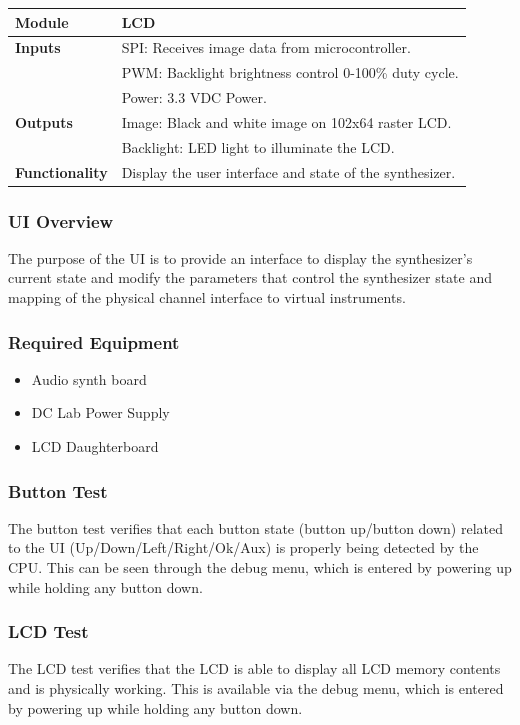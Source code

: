 \documentclass{article}
\begin{document}
\begin{tabular}{|p{1in}|p{5in}|}
\hline
\textbf{Module} & LCD \\
\hline
\textbf{Inputs}& SPI: Receives image data from microcontroller.\\
	     & PWM: Backlight brightness control 0-100\% duty cycle.\\
	     & Power: 3.3 VDC Power.\\
\hline
\textbf{Outputs}& Image: Black and white image on 102x64 raster LCD.\\
	      & Backlight: LED light to illuminate the LCD.\\ 
\hline
\textbf{Functionality}& Display the user interface and state of the synthesizer.\\
\hline
\end{tabular}

\subsubsection{UI Overview}
The purpose of the UI is to provide an interface to display the synthesizer's current state and modify the parameters that control the synthesizer state and mapping of the physical channel interface to virtual instruments. 
\subsubsection{Required Equipment}
\begin{itemize}
\item Audio synth board
\item DC Lab Power Supply
\item LCD Daughterboard
\end{itemize}
\subsubsection{Button Test}
The button test verifies that each button state (button up/button down) related to the UI (Up/Down/Left/Right/Ok/Aux) is properly being detected by the CPU. This can be seen through the debug menu, which is entered by powering up while holding any button down. 
\subsubsection{LCD Test}
The LCD test verifies that the LCD is able to display all LCD memory contents and is physically working. This is available via the debug menu, which is entered by powering up while holding any button down.
\end{document}
